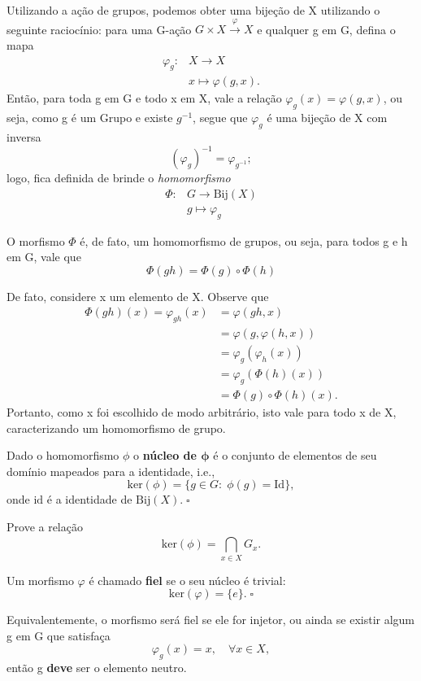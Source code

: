 \documentclass[../algebraIII_notes.tex]{subfiles}
\begin{document}
Utilizando a ação de grupos, podemos obter uma bijeção de X utilizando o seguinte raciocínio: para uma G-ação \(G\times X \stackrel{\varphi }\rightarrow X\) e qualquer g em G, defina o mapa
\begin{align*}
	\varphi_{g}: & X\rightarrow X               \\
	             & x\longmapsto \varphi (g, x).
\end{align*}
Então, para toda g em G e todo x em X, vale a relação \( \varphi_{g}(x) = \varphi (g, x)\), ou seja, como g é um Grupo e existe \(g^{-1}\), segue que \( \varphi_{g}\) é uma bijeção de X com inversa
\[
	(\varphi_{g})^{-1} = \varphi_{g^{-1}};
\]
logo, fica definida de brinde o \textit{homomorfismo}
\begin{align*}
	\Phi : & G\rightarrow \mathrm{Bij}(X) \\
	       & g\longmapsto \varphi_{g}
\end{align*}
\begin{theorem*}
	O morfismo \(\Phi \) é, de fato, um homomorfismo de grupos, ou seja, para todos g e h em G, vale que
	\[
		\Phi (gh) = \Phi (g) \circ \Phi (h)
	\]
\end{theorem*}
\begin{proof*}
	De fato, considere x um elemento de X. Observe que
	\begin{align*}
		\Phi (gh)(x) = \varphi_{gh}(x) & = \varphi (gh, x)             \\
		                               & = \varphi (g, \varphi (h, x)) \\
		                               & = \varphi_{g}(\varphi_{h}(x)) \\
		                               & = \varphi_{g}(\Phi (h)(x))    \\
		                               & = \Phi (g)\circ \Phi (h)(x).
	\end{align*}
	Portanto, como x foi escolhido de modo arbitrário, isto vale para todo x de X, caracterizando um homomorfismo de grupo. \qedsymbol
\end{proof*}
\begin{def*}
	Dado o homomorfismo \(\phi\) o \textbf{núcleo de \(\mathbf{\phi}\)} é o conjunto de elementos de seu domínio mapeados para a identidade, i.e.,
	\[
		\mathrm{ker}(\phi) = \{g\in G:\; \phi(g)=\mathrm{Id}\},
	\]
	onde \(\mathrm{id}\) é a identidade de \(\mathrm{Bij}(X).\; \square\)
\end{def*}
\begin{exr}
	Prove a relação
	\[
		\mathrm{ker}(\phi )=\bigcap_{x\in X}^{}G_{x}.
	\]
\end{exr}
\begin{def*}
	Um morfismo \(\varphi \) é chamado \textbf{fiel} se o seu núcleo é trivial:
	\[
		\mathrm{ker}(\varphi ) = \{e\}.\; \square
	\]
\end{def*}
Equivalentemente, o morfismo será fiel se ele for injetor, ou ainda se existir algum g em G que satisfaça
\[
	\varphi_{g}(x) = x, \quad \forall x\in X,
\]
então g \textbf{deve} ser o elemento neutro.
\end{document}
